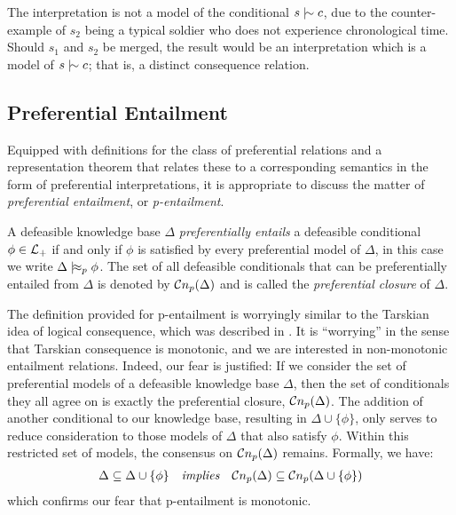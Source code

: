 The interpretation is not a model of the conditional $s \twiddle c$, due to the counter-example of $s_{2}$ being a typical
soldier who does not experience chronological time. Should $s_{1}$ and $s_{2}$ be merged, the result would be an interpretation
which is a model of $s\twiddle c$; that is, a distinct consequence relation.

\subsection{Preferential Entailment}
\label{subsection:preferential-entailment}

Equipped with definitions for the class of preferential relations and a representation theorem that relates these to a
corresponding semantics in the form of preferential interpretations, it is appropriate to discuss the matter of \textit{preferential
entailment}, or \textit{p-entailment}.

\begin{definition}
	\label{definition:p-entailment}

	A defeasible knowledge base $\Delta$ \textit{preferentially entails} a defeasible conditional $\phi \in \mathcal{L}_+$ if and only
	if $\phi$ is satisfied by every preferential model of $\Delta$, in this case we write $\Delta \mid\hskip-0.40ex\approx_{p}\phi$. The set
	of all defeasible conditionals that can be preferentially entailed from $\Delta$ is denoted by $\mathcal{C}n_{p}(\Delta)$ and is
	called the \textit{preferential closure} of $\Delta$.
\end{definition}

The definition provided for p-entailment is worryingly similar to the Tarskian idea of logical consequence, which was
described in . It is ``worrying'' in the sense that Tarskian consequence is monotonic,
and we are interested in non-monotonic entailment relations. Indeed, our fear is justified: If we consider the set of preferential
models of a defeasible knowledge base $\Delta$, then the set of conditionals they all agree on is exactly the
preferential closure, $\mathcal{C}n_{p}(\Delta)$. The addition of another conditional to our knowledge base, resulting in $\Delta \cup
\{\phi \}$, only serves to reduce consideration to those models of $\Delta$ that also satisfy $\phi$. Within this restricted
set of models, the consensus on $\mathcal{C}n_{p}(\Delta )$ remains. Formally, we have:
\begin{align}
	\Delta \subseteq \Delta \cup \{\phi\} \quad \textit{implies}\quad \mathcal{C}n_{p}(\Delta) \subseteq \mathcal{C}n_{p}(\Delta \cup \{ \phi \})
\end{align}
which confirms our fear that p-entailment is monotonic.

